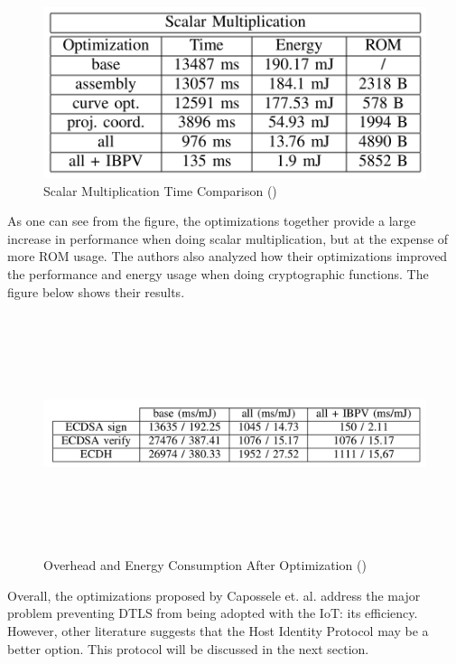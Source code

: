 \documentclass[letterpaper, 12pt]{article}
\begin{document}
\begin{flushleft}
\begin{figure}[H]
	\includegraphics[width=\linewidth,height=5cm,keepaspectratio]{figure6.png}
	\caption[Scalar Multiplication Time Comparison]{Scalar Multiplication Time Comparison (\cite{Capossele})}
	\label{fig:arch}
\end{figure}

As one can see from the figure, the optimizations together provide a large increase in performance when doing scalar multiplication, but at the expense of more ROM usage. 
The authors also analyzed how their optimizations improved the performance and energy usage when doing cryptographic functions. The figure below
shows their results. 

\begin{figure}[H]
	\includegraphics[width=\linewidth,height=7cm,keepaspectratio]{figure5.png}
	\caption[Overhead and Energy Consumption After Optimization]{Overhead and Energy Consumption After Optimization (\cite{Capossele})}
	\label{fig:arch}
\end{figure}

Overall, the optimizations proposed by Capossele et. al. address the major problem preventing DTLS from being adopted with the IoT: its efficiency.
However, other literature suggests that the Host Identity Protocol may be a better option. This protocol will be discussed in the next section.


\end{flushleft}
\end{document}
